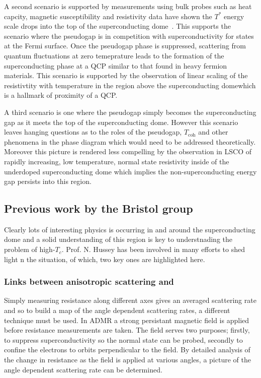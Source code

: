 A second scenario is supported by measurements using bulk probes such as heat capcity, magnetic susceptibility and resistivity data have shown the $T^*$ energy scale drops into the top of the superconducting dome~\cite{Tallon2001}. This supports the scenario where the pseudogap is in competition with superconductivity for states at the Fermi surface. Once the pseudogap phase is suppressed, scattering from quantum fluctuations at zero temeprature leads to the formation of the superconducting phase at a \ac{QCP} similar to that found in heavy fermion materials. This scenario is supported by the observation of linear scaling of the resistivtity with temperature in the region above the superconducting domewhich is a hallmark of proximity of a \ac{QCP}.

A third scenario is one where the pseudogap simply becomes the superconducting gap as it meets the top of the superconducting dome. However this scenario leaves hanging questions as to the roles of the pseudogap, $T_{\textrm{coh}}$ and other phenomena in the phase diagram which would need to be addressed theoretically. Moreover this picture is rendered less compelling by the observation in LSCO of rapidly increasing, low temperature, normal state resistivity inside of the underdoped superconducting dome which implies the non-superconducting energy gap persists into this region.


\subsection{Previous work by the Bristol group}

Clearly lots of interesting physics is occurring in and around the superconducting dome and a solid understanding of this region is key to understnading the problem of high-$T_c$. Prof. N. Hussey has been involved in many efforts to shed light n the situation, of which, two key ones are highlighted here.

\subsubsection{Links between anisotropic scattering and \Tc}

Simply measuring resistance along different axes gives an averaged scattering rate and so to build a map of the angle dependent scattering rates, a different technique must be used. In \ac{ADMR} a strong persistant magnetic field is applied before resistance measurements are taken. The field serves two purposes; firstly, to suppress superconductivity so the normal state can be probed, secondly to confine the electrons to orbits perpendicular to the field. By detailed analysis of the change in resistance as the field is applied at various angles, a picture of the angle dependent scattering rate can be determined.

